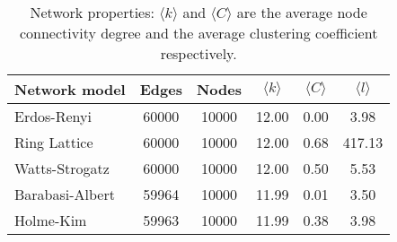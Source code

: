 \begin{table}[h!]
\centering
\caption{Network properties: $\langle k \rangle$ and $\langle C \rangle$ are the average node connectivity degree and the average clustering coefficient respectively. }
\label{tab:networks}
\begin{tabular}{lccccc}
\toprule
         Network model &  Edges &  Nodes & $\langle k \rangle$ & $\langle C \rangle$ & $\langle l \rangle$ \\ 
\midrule
     Erdos-Renyi &  60000 &  10000 & 12.00 &  0.00 &    3.98 \\
    Ring Lattice &  60000 &  10000 & 12.00 &  0.68 &  417.13 \\
  Watts-Strogatz &  60000 &  10000 & 12.00 &  0.50 &    5.53 \\
 Barabasi-Albert &  59964 &  10000 & 11.99 &  0.01 &    3.50 \\
       Holme-Kim &  59963 &  10000 & 11.99 &  0.38 &    3.98 \\
\bottomrule
\end{tabular}
\end{table}

